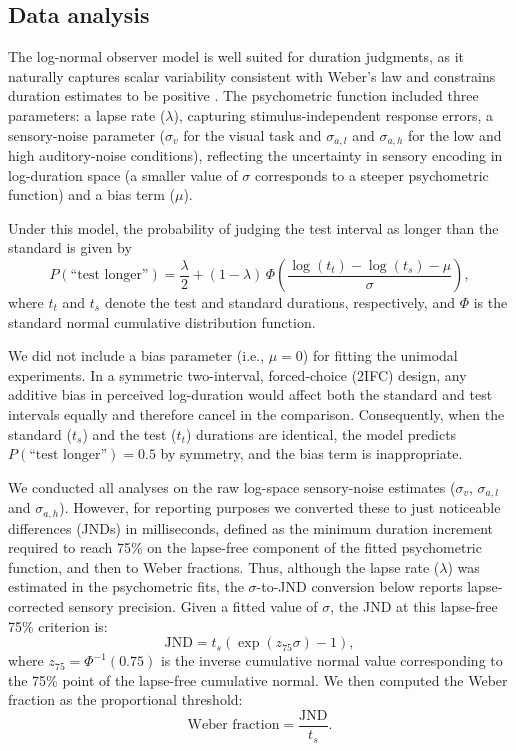\documentclass{biorxiv}
\providecommand{\citep}[1]{\cite{#1}}
\begin{document}
\subsection{Data analysis}

The log-normal observer model is well suited for duration judgments, as it naturally captures scalar variability consistent with Weber's law and constrains duration estimates to be positive \citep{haigh2021role}. The psychometric function included three parameters: a lapse rate ($\lambda$), capturing stimulus-independent response errors, a sensory-noise parameter ($\sigma_v$ for the visual task and $\sigma_{a,l}$ and $\sigma_{a,h}$ for the low and high auditory-noise conditions), reflecting the uncertainty in sensory encoding in log-duration space (a smaller value of $\sigma$ corresponds to a steeper psychometric function) and a bias term ($\mu$).

Under this model, the probability of judging the test interval as longer than the standard is given by
\begin{equation}
P(\text{``test longer''}) = \frac{\lambda}{2} + (1-\lambda)\,
\Phi\!\left(\frac{\log(t_t)-\log(t_s)-\mu}{\sigma}\right),
\end{equation}
where $t_t$ and $t_s$ denote the test and standard durations, respectively, and $\Phi$ is the standard normal cumulative distribution function.

We did not include a bias parameter (i.e., $\mu=0$) for fitting the unimodal experiments. In a symmetric two-interval, forced-choice (2IFC) design, any additive bias in perceived log-duration would affect both the standard and test intervals equally and therefore cancel in the comparison. Consequently, when  the standard ($t_s$) and the test ($t_t$) durations are identical, the model predicts $P(\text{``test longer''}) = 0.5$ by symmetry, and the bias term is inappropriate. 

We conducted all analyses on the raw log-space sensory-noise estimates ($\sigma_v$, $\sigma_{a,l}$ and $\sigma_{a,h}$). However, for reporting purposes we converted these to just noticeable differences (JNDs) in milliseconds, defined as the minimum duration increment required to reach 75\% on the lapse-free component of the fitted psychometric function, and then to Weber fractions. Thus, although the lapse rate ($\lambda$) was estimated in the psychometric fits, the $\sigma$-to-JND conversion below reports lapse-corrected sensory precision. Given a fitted value of $\sigma$, the JND at this lapse-free 75\% criterion is:
\begin{equation}
\text{JND} = t_s \left( \exp\left(z_{75}\sigma\right) - 1 \right),
\label{sigma2JND_eq}
\end{equation}
where $z_{75} = \Phi^{-1}(0.75)$ is the inverse cumulative normal value corresponding to the 75\% point of the lapse-free cumulative normal. We then computed the Weber fraction as the proportional threshold:
\begin{equation}
\text{Weber fraction} = \frac{\text{JND}}{t_s}.
\label{WF_eq}
\end{equation}
\end{document}
